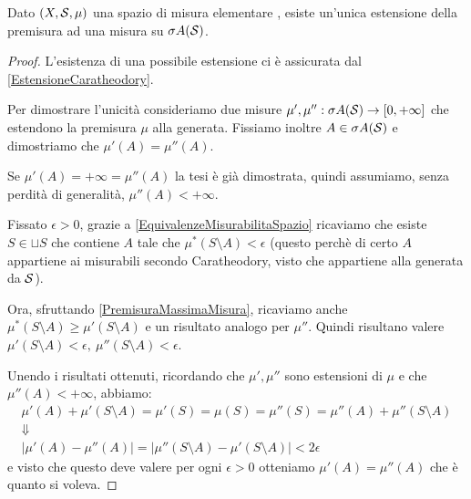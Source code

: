 \begin{proposition}\label{UnicitaCaratheodory}
	Dato $(X,\S,\mu)$ una spazio di misura elementare \sigfin[o], esiste un'unica estensione della premisura ad una misura su $\sigma A(\S)$.
\end{proposition}
\begin{proof}
	L'esistenza di una possibile estensione ci è assicurata dal \cref{EstensioneCaratheodory}.
	
	Per dimostrare l'unicità consideriamo due misure $\mu',\mu'':\sigma A(\S)\to\Rpiu$ che estendono la premisura $\mu$ alla \sigalg{} generata. Fissiamo inoltre $A\in\sigma A(\S)$ e dimostriamo che $\mu'(A)=\mu''(A)$.
	
	Se $\mu'(A)=+\infty=\mu''(A)$ la tesi è già dimostrata,  quindi assumiamo, senza perdità di generalità, $\mu''(A)<+\infty$.
	
	Fissato $\epsilon>0$, grazie a \cref{EquivalenzeMisurabilitaSpazio} ricaviamo che esiste $S\in\sqcup S$ che contiene $A$ tale che $\mu^*(S\setminus A)< \epsilon$ (questo perchè di certo $A$ appartiene ai misurabili secondo Caratheodory, visto che appartiene alla \sigalg{} generata da $\S$).
	
	Ora, sfruttando \cref{PremisuraMassimaMisura}, ricaviamo anche $\mu^*(S\setminus A)\ge\mu'(S\setminus A)$ e un risultato analogo per $\mu''$. Quindi risultano valere $\mu'(S\setminus A)<\epsilon,\ \mu''(S\setminus A)<\epsilon$.
	
	Unendo i risultati ottenuti, ricordando che $\mu',\mu''$ sono estensioni di $\mu$ e che $\mu''(A)<+\infty$,  abbiamo:
	\begin{gather*}
		\mu'(A)+\mu'(S\setminus A)=\mu'(S)=\mu(S)=\mu''(S)=\mu''(A)+\mu''(S\setminus A) \\
		\Downarrow \\
		\lvert\mu'(A)-\mu''(A)\rvert=\lvert\mu''(S\setminus A)-\mu'(S\setminus A)\rvert<2\epsilon
	\end{gather*}
	e visto che questo deve valere per ogni $\epsilon>0$ otteniamo $\mu'(A)=\mu''(A)$ che è quanto si voleva.
\end{proof}

